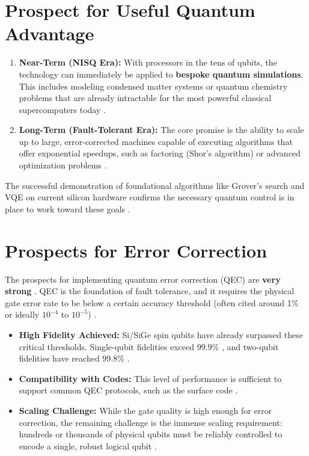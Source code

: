 \section{Prospect for Useful Quantum Advantage}


\begin{enumerate}
    \item \textbf{Near-Term (NISQ Era):} With processors in the tens of qubits, the technology can immediately be applied to \textbf{bespoke quantum simulations}. This includes modeling condensed matter systems or quantum chemistry problems that are already intractable for the most powerful classical supercomputers today \cite{ref8, ref9}.
    \item \textbf{Long-Term (Fault-Tolerant Era):} The core promise is the ability to scale up to large, error-corrected machines capable of executing algorithms that offer exponential speedups, such as factoring (Shor's algorithm) or advanced optimization problems \cite{ref12}.
\end{enumerate}
The successful demonstration of foundational algorithms like Grover's search and VQE on current silicon hardware confirms the necessary quantum control is in place to work toward these goals \cite{ref2, ref9}.

\section{Prospects for Error Correction}

The prospects for implementing quantum error correction (QEC) are \textbf{very strong} \cite{ref12}. QEC is the foundation of fault tolerance, and it requires the physical gate error rate to be below a certain accuracy threshold (often cited around 1\% or ideally $10^{-4}$ to $10^{-5}$) \cite{ref5, ref12}.

\begin{itemize}
    \item \textbf{High Fidelity Achieved:} Si/SiGe spin qubits have already surpassed these critical thresholds. Single-qubit fidelities exceed $99.9\%$ \cite{ref4}, and two-qubit fidelities have reached $99.8\%$ \cite{ref1}.
    \item \textbf{Compatibility with Codes:} This level of performance is sufficient to support common QEC protocols, such as the surface code \cite{ref1, ref9}.
    \item \textbf{Scaling Challenge:} While the gate quality is high enough for error correction, the remaining challenge is the immense scaling requirement: hundreds or thousands of physical qubits must be reliably controlled to encode a single, robust logical qubit \cite{ref5, ref12}.
\end{itemize}

